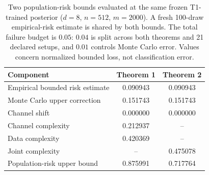 \begin{table}[!htbp]
\centering\footnotesize
\caption{Two population-risk bounds evaluated at the same frozen T1-trained posterior ($d=8$, $n=512$, $m=2000$). A fresh 100-draw empirical-risk estimate is shared by both bounds. The total failure budget is $0.05$: $0.04$ is split across both theorems and 21 declared setups, and $0.01$ controls Monte Carlo error. Values concern normalized bounded loss, not classification error.}
\label{tab:sim_certificate}
\begin{tabular}{lcc}
\toprule
Component & Theorem 1 & Theorem 2\\
\midrule
Empirical bounded risk estimate & 0.090943 & 0.090943\\
Monte Carlo upper correction & 0.151743 & 0.151743\\
Channel shift & 0.000000 & 0.000000\\
Channel complexity & 0.212937 & --\\
Data complexity & 0.420369 & --\\
Joint complexity & -- & 0.475078\\
\midrule
Population-risk upper bound & 0.875991 & 0.717764\\
\bottomrule
\end{tabular}
\end{table}
